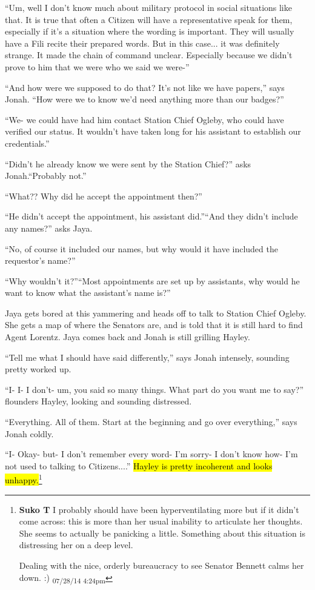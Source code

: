 ``Um, well I don't know much about military protocol in social situations like that.  It is true that often a Citizen will have a representative speak for them, especially if it's a situation where the wording is important.  They will usually have a Fili recite their prepared words.  But in this case... it was definitely strange.  It made the chain of command unclear.  Especially because we didn't prove to him that we were who we said we were-''

``And how were we supposed to do that?  It's not like we have papers,'' says Jonah. ``How were we to know we'd need anything more than our badges?''

``We- we could have had him contact Station Chief Ogleby, who could have verified our status.  It wouldn't have taken long for his assistant to establish our credentials.''

``Didn't he already know we were sent by the Station Chief?'' asks Jonah.``Probably not.''

``What??  Why did he accept the appointment then?''

``He didn't accept the appointment, his assistant did.''``And they didn't include any names?'' asks Jaya.

``No, of course it included our names, but why would it have included the requestor's name?''

``Why wouldn't it?''``Most appointments are set up by assistants, why would he want to know what the assistant's name is?''



Jaya gets bored at this yammering and heads off to talk to Station Chief Ogleby.  She gets a map of where the Senators are, and is told that it is still hard to find Agent Lorentz.  Jaya comes back and Jonah is still grilling Hayley.  



``Tell me what I should have said differently,'' says Jonah intensely, sounding pretty worked up.

``I- I- I don't- um, you said so many things.  What part do you want me to say?'' flounders Hayley, looking and sounding distressed.

``Everything.  All of them.  Start at the beginning and go over everything,'' says Jonah coldly.

``I- Okay- but- I don't remember every word- I'm sorry- I don't know how- I'm not used to talking to Citizens....'' \hl{Hayley is pretty incoherent and looks unhappy.}\footnote{\textbf{Suko T }I probably should have been hyperventilating more but if it didn't come across: this is more than her usual inability to articulate her thoughts.  She seems to actually be panicking a little.  Something about this situation is distressing her on a deep level.

Dealing with the nice, orderly bureaucracy to see Senator Bennett calms her down. :) \textsubscript{07/28/14 4:24pm}}

